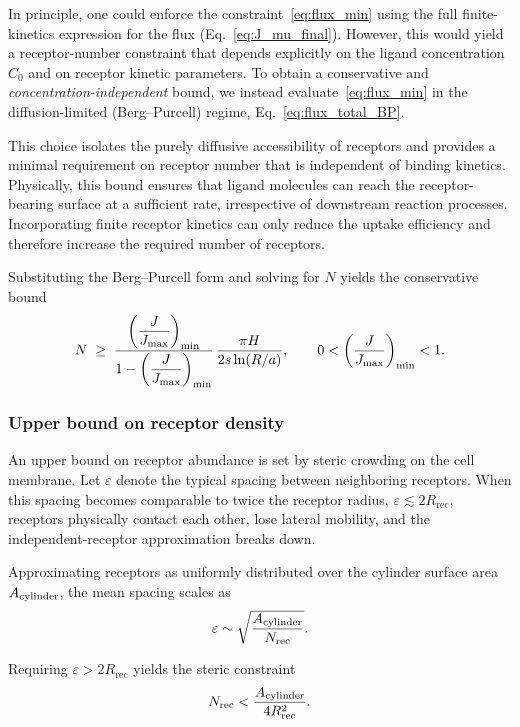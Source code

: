 In principle, one could enforce the constraint~\eqref{eq:flux_min} using the full finite-kinetics expression for the flux (Eq.~\eqref{eq:J_mu_final}).
However, this would yield a receptor-number constraint that depends explicitly on the ligand concentration $C_{0}$ and on receptor kinetic parameters.
To obtain a conservative and \textit{concentration-independent} bound, we instead evaluate~\eqref{eq:flux_min} in the diffusion-limited (Berg--Purcell) regime, Eq.~\eqref{eq:flux_total_BP}.

This choice isolates the purely diffusive accessibility of receptors and provides a minimal requirement on receptor number that is independent of binding kinetics.
Physically, this bound ensures that ligand molecules can reach the receptor-bearing surface at a sufficient rate, irrespective of downstream reaction processes.
Incorporating finite receptor kinetics can only reduce the uptake efficiency and therefore increase the required number of receptors.

Substituting the Berg--Purcell form and solving for $N$ yields the conservative bound
\begin{equation}
    N \;\ge\; \frac{\left(\dfrac{J}{J_{\mathrm{max}}}\right)_{\min}}{1 - \left(\dfrac{J}{J_{\mathrm{max}}}\right)_{\min}}\,\frac{\pi H}{2 s \ln(R/a)}, \qquad 0 < \left(\frac{J}{J_{\mathrm{max}}}\right)_{\min} < 1.
    \label{eq:N_min}
\end{equation}

\subsubsection{Upper bound on receptor density}\label{sec:receptor_upper}
An upper bound on receptor abundance is set by steric crowding on the cell membrane.
Let $\varepsilon$ denote the typical spacing between neighboring receptors.
When this spacing becomes comparable to twice the receptor radius, $\varepsilon \lesssim 2 R_{\mathrm{rec}}$, receptors physically contact each other, lose lateral mobility, and the independent-receptor approximation breaks down.

Approximating receptors as uniformly distributed over the cylinder surface area $A_{\mathrm{cylinder}}$, the mean spacing scales as
\begin{equation}
    \varepsilon \sim \sqrt{\frac{A_{\mathrm{cylinder}}}{N_{\mathrm{rec}}}}.
    \label{eq:epsilon}
\end{equation}

Requiring $\varepsilon > 2 R_{\mathrm{rec}}$ yields the steric constraint
\begin{equation}
    N_{\mathrm{rec}} < \frac{A_{\mathrm{cylinder}}}{4 R_{\mathrm{rec}}^{2}}.
    \label{eq:N_steric}
\end{equation}


